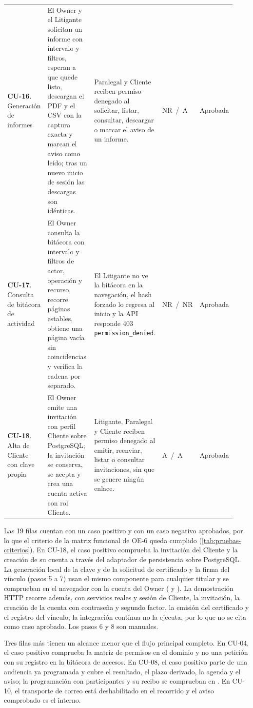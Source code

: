 \begin{longtable}{@{}L{0.155\linewidth} L{0.28\linewidth} L{0.295\linewidth} C{0.09\linewidth} L{0.11\linewidth}@{}}
  \addlinespace
  \textbf{CU-16}. Generación de informes & El Owner y el Litigante solicitan un informe con intervalo y filtros, esperan a que quede listo, descargan el PDF y el CSV con la captura exacta y marcan el aviso como leído; tras un nuevo inicio de sesión las descargas son idénticas. & Paralegal y Cliente reciben permiso denegado al solicitar, listar, consultar, descargar o marcar el aviso de un informe. & NR~/~A & Aprobada \\
  \addlinespace
  \textbf{CU-17}. Consulta de bitácora de actividad & El Owner consulta la bitácora con intervalo y filtros de actor, operación y recurso, recorre páginas estables, obtiene una página vacía sin coincidencias y verifica la cadena por separado. & El Litigante no ve la bitácora en la navegación, el hash forzado lo regresa al inicio y la API responde 403 \texttt{permission\_denied}. & NR~/~NR & Aprobada \\
  \addlinespace
  \textbf{CU-18}. Alta de Cliente con clave propia & El Owner emite una invitación con perfil Cliente sobre PostgreSQL; la invitación se conserva, se acepta y crea una cuenta activa con rol Cliente. & Litigante, Paralegal y Cliente reciben permiso denegado al emitir, reenviar, listar o consultar invitaciones, sin que se genere ningún enlace. & A~/~A & Aprobada \\
\end{longtable}
\endgroup

Las 19 filas cuentan con un caso positivo y con un caso negativo aprobados, por lo que el criterio de la matriz funcional de OE-6 queda cumplido (\cref{tab:pruebas-criterios}). En CU-18, el caso positivo comprueba la invitación del Cliente y la creación de su cuenta a través del adaptador de persistencia sobre PostgreSQL. La generación local de la clave y de la solicitud de certificado y la firma del vínculo (pasos 5 a 7) usan el mismo componente para cualquier titular y se comprueban en el navegador con la cuenta del Owner ( y ). La demostración HTTP  recorre además, con servicios reales y sesión de Cliente, la invitación, la creación de la cuenta con contraseña y segundo factor, la emisión del certificado y el registro del vínculo; la integración continua no la ejecuta, por lo que no se cita como caso aprobado. Los pasos 6 y 8 son manuales.

Tres filas más tienen un alcance menor que el flujo principal completo. En CU-04, el caso positivo comprueba la matriz de permisos en el dominio y no una petición con su registro en la bitácora de accesos. En CU-08, el caso positivo parte de una audiencia ya programada y cubre el resultado, el plazo derivado, la agenda y el aviso; la programación con participantes y su recibo se comprueban en . En CU-10, el transporte de correo está deshabilitado en el recorrido y el aviso comprobado es el interno.

